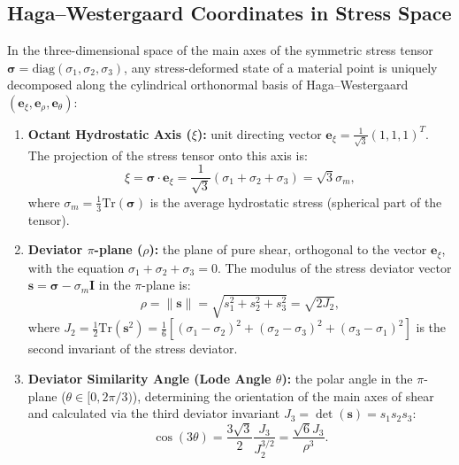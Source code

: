 \documentclass[12pt,a4paper]{article}
\begin{document}
	\subsection{Haga--Westergaard Coordinates in Stress Space}
	In the three-dimensional space of the main axes of the symmetric stress tensor $\boldsymbol{\sigma} = \mathrm{diag}(\sigma_1, \sigma_2, \sigma_3)$, any stress-deformed state of a material point is uniquely decomposed along the cylindrical orthonormal basis of Haga--Westergaard $(\mathbf{e}_\xi, \mathbf{e}_\rho, \mathbf{e}_\theta)$:
	\begin{enumerate}
	\item \textbf{Octant Hydrostatic Axis ($\xi$):} unit directing vector $\mathbf{e}_\xi = \frac{1}{\sqrt{3}}(1, 1, 1)^T$. The projection of the stress tensor onto this axis is:
	\begin{equation}
	\xi = \boldsymbol{\sigma} \cdot \mathbf{e}_\xi = \frac{1}{\sqrt{3}}(\sigma_1 + \sigma_2 + \sigma_3) = \sqrt{3}\sigma_m,
	\end{equation}
	where $\sigma_m = \frac{1}{3}\mathrm{Tr}(\boldsymbol{\sigma})$ is the average hydrostatic stress (spherical part of the tensor).
		
	\item \textbf{Deviator $\pi$-plane ($\rho$):} the plane of pure shear, orthogonal to the vector $\mathbf{e}_\xi$, with the equation $\sigma_1 + \sigma_2 + \sigma_3 = 0$. The modulus of the stress deviator vector $\mathbf{s} = \boldsymbol{\sigma} - \sigma_m \mathbf{I}$ in the $\pi$-plane is:
	\begin{equation}
	\rho = \|\mathbf{s}\| = \sqrt{s_1^2 + s_2^2 + s_3^2} = \sqrt{2 J_2},
	\end{equation}
	where $J_2 = \frac{1}{2}\mathrm{Tr}(\mathbf{s}^2) = \frac{1}{6}\left[ (\sigma_1 - \sigma_2)^2 + (\sigma_2 - \sigma_3)^2 + (\sigma_3 - \sigma_1)^2 \right]$ is the second invariant of the stress deviator.
		
	\item \textbf{Deviator Similarity Angle (Lode Angle $\theta$):} the polar angle in the $\pi$-plane ($\theta \in [0, 2\pi/3)$), determining the orientation of the main axes of shear and calculated via the third deviator invariant $J_3 = \det(\mathbf{s}) = s_1 s_2 s_3$:
	\begin{equation}
	\cos(3\theta) = \frac{3\sqrt{3}}{2} \frac{J_3}{J_2^{3/2}} = \frac{\sqrt{6} J_3}{\rho^3}.
	\end{equation}
	\end{enumerate}
	
\end{document}
